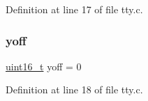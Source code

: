 Definition at line 17 of file tty.\+c.

\mbox{\label{a00080_a1a7539764d0ae8cd06ce45c62cf92bca_a1a7539764d0ae8cd06ce45c62cf92bca}} 
\subsubsection{\texorpdfstring{yoff}{yoff}}
{\footnotesize\ttfamily \hyperlink{a00068_a273cf69d639a59973b6019625df33e30_a273cf69d639a59973b6019625df33e30}{uint16\+\_\+t} yoff = 0}



Definition at line 18 of file tty.\+c.

